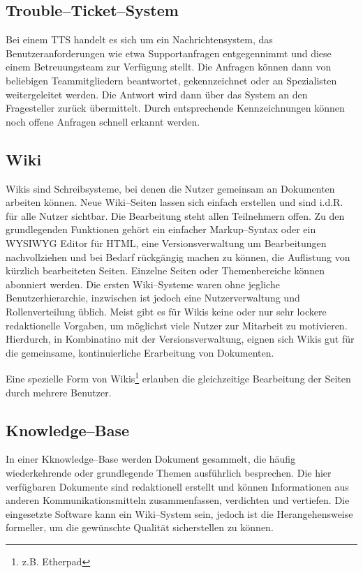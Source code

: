 \subsection{Trouble–Ticket–System} %
\label{sub:trouble_ticket_systmee}
Bei einem \ac{TTS} handelt es sich um ein Nachrichtensystem, das Benutzeranforderungen wie etwa Supportanfragen entgegennimmt und diese einem Betreuungsteam zur Verfügung stellt. Die Anfragen können dann von beliebigen Teammitgliedern beantwortet, gekennzeichnet oder an Spezialisten weitergeleitet werden. Die Antwort wird dann über das System an den Fragesteller zurück übermittelt. Durch entsprechende Kennzeichnungen können noch offene Anfragen schnell erkannt werden. 

\subsection{Wiki} %
\label{sub:wikis}
Wikis sind Schreibsysteme, bei denen die Nutzer gemeinsam an Dokumenten arbeiten können. Neue Wiki--Seiten lassen sich einfach erstellen und sind i.d.R. für alle Nutzer sichtbar. Die Bearbeitung steht allen Teilnehmern offen. Zu den grundlegenden Funktionen gehört ein einfacher Markup--Syntax oder ein \ac{WYSIWYG} Editor für \ac{HTML}, eine Versionsverwaltung um Bearbeitungen nachvollziehen und bei Bedarf rückgängig machen zu können, die Auflistung von kürzlich bearbeiteten Seiten. Einzelne Seiten oder Themenbereiche können abonniert werden. Die ersten Wiki--Systeme waren ohne jegliche Benutzerhierarchie, inzwischen ist jedoch eine Nutzerverwaltung und Rollenverteilung üblich. Meist gibt es für Wikis keine oder nur sehr lockere redaktionelle Vorgaben, um möglichst viele Nutzer zur Mitarbeit zu motivieren. Hierdurch, in Kombinatino mit der Versionsverwaltung, eignen sich Wikis gut für die gemeinsame, kontinuierliche Erarbeitung von Dokumenten.

Eine spezielle Form von Wikis\footnote{z.B. Etherpad} erlauben die gleichzeitige Bearbeitung der Seiten durch mehrere Benutzer.

\subsection{Knowledge--Base} %
\label{sub:knowledge_bases}
In einer Kknowledge--Base werden Dokument gesammelt, die häufig wiederkehrende oder grundlegende Themen ausführlich besprechen. Die hier verfügbaren Dokumente sind redaktionell erstellt und können Informationen aus  anderen Kommunikationsmitteln zusammenfassen, verdichten und vertiefen. Die eingesetzte Software kann ein Wiki--System sein, jedoch ist die Herangehensweise formeller, um die gewünschte Qualität sicherstellen zu können.

